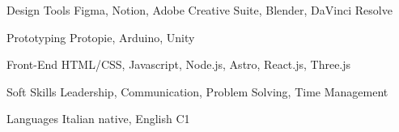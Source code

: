 

\begin{cvskills}

  \cvskill
    {Design Tools} %
    {Figma, Notion, Adobe Creative Suite, Blender, DaVinci Resolve} %

  \cvskill
    {Prototyping} %
    {Protopie, Arduino, Unity} %

  \cvskill
    {Front-End} %
    {HTML/CSS, Javascript, Node.js, Astro, React.js, Three.js} %

  \cvskill
    {Soft Skills} %
    {Leadership, Communication, Problem Solving, Time Management} %

  \cvskill
    {Languages} %
    {Italian native, English C1} %

\end{cvskills}
